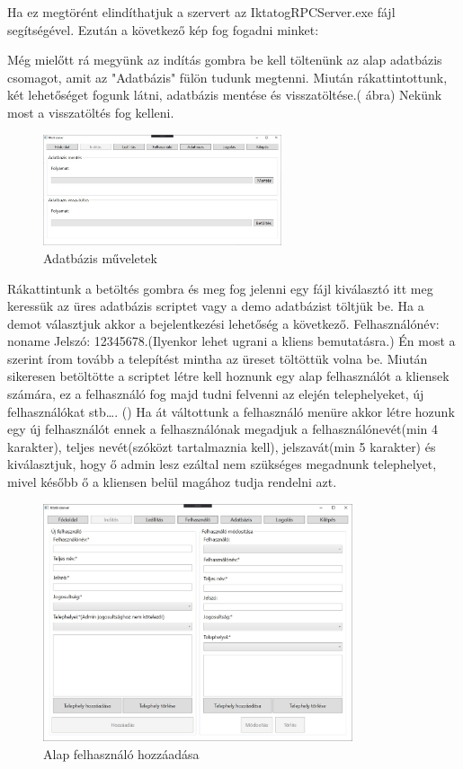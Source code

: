 \documentclass[
]{thesis-ekf}
\theoremstyle{definition}
\theoremstyle{remark}
\begin{document}
Ha ez megtörént elindíthatjuk a szervert az IktatogRPCServer.exe fájl segítségével. Ezután a következő kép fog fogadni minket:

Még mielőtt rá megyünk az indítás gombra be kell töltenünk az alap adatbázis csomagot, amit az "Adatbázis" fülön tudunk megtenni. Miután rákattintottunk, két lehetőséget fogunk látni, adatbázis mentése és visszatöltése.(\Az{\ref{fig:sadat}} ábra) Nekünk most a visszatöltés fog kelleni.
\begin{figure}[h!]
	\centering
	\includegraphics[width=7cm]{dokukepek/sadat}
	\caption{Adatbázis műveletek}
	\label{fig:sadat}
\end{figure}
Rákattintunk a betöltés gombra és meg fog jelenni egy fájl kiválasztó itt meg keressük az üres adatbázis scriptet vagy a demo adatbázist töltjük be. Ha a demot választjuk akkor a bejelentkezési lehetőség a következő. Felhasználónév: noname Jelszó: 12345678.(Ilyenkor lehet ugrani a kliens bemutatásra.) Én most a szerint írom tovább a telepítést mintha az üreset töltöttük volna be. Miután sikeresen betöltötte a scriptet létre kell hoznunk egy alap felhasználót a kliensek számára, ez a felhasználó fog majd tudni felvenni az elején telephelyeket, új felhasználókat stb\dots. () Ha át váltottunk a felhasználó menüre akkor létre hozunk egy új felhasználót ennek a felhasználónak megadjuk a felhasználónevét(min 4 karakter), teljes nevét(szóközt tartalmaznia kell), jelszavát(min 5 karakter) és kiválasztjuk, hogy ő admin lesz ezáltal nem szükséges megadnunk telephelyet, mivel később ő a kliensen belül magához tudja rendelni azt.
\begin{figure}[!h]
	\centering
	\includegraphics[height=7cm]{dokukepek/sfelh}
	\caption{Alap felhasználó hozzáadása}
	\label{fig:sfelh}
\end{figure}
\end{document}
